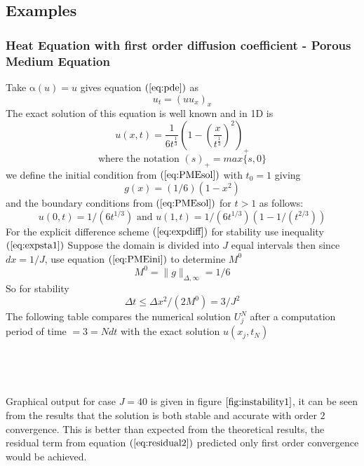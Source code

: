 \documentclass[11pt]{article}
\newcommand{\D}{\Delta}
\newcommand{\al}{\mathrm{\alpha}}
\begin{document}
\subsection{Examples}
\setcounter{tocdepth}{5}
\subsubsection{Heat Equation with first order diffusion coefficient - Porous Medium Equation }
Take $\al(u) = u $ gives equation $(\ref{eq:pde})$ as
\begin{equation} 
u_t = (uu_x)_x
\end{equation}
The exact solution of this equation is well known \cite{Baines2016} and in 1D is
\begin{equation}
\label{eq:PMEsol}
u(x,t) = \frac{1}{6t^{ \frac{1}{3} }  } \left(  1-\left(    \frac{x }{t^{\frac{1}{3}  }  } \right)^2   \right)_{+}
\end{equation}
$$\text{where the notation } (s)_{+ }= max\{s,0\} $$
we define the initial condition from $(\ref{eq:PMEsol})$ with $t_0 = 1$ giving
\begin{equation}
\label{eq:PMEini}
 g(x) = (1/6)(1-x^2)
\end{equation}
and the boundary conditions from $(\ref{eq:PMEsol})$ for $t > 1$ as follows:
$$ u(0,t) = 1/(6t^{1/3}) \text{ and } u(1,t) = 1/(6t^{1/3})\left(1-1/(t^{2/3})\right)$$
For the explicit difference scheme $(\ref{eq:expdiff})$ for stability use inequality $(\ref{eq:expsta1})$
Suppose the domain is divided into $J$ equal intervals then since $dx = 1/J $, use equation $(\ref{eq:PMEini})$ to determine $M^0$
$$M^0 = \|g\|_{\D,\infty} = 1/6$$
So for stability $$\D{t} \leq \D{x^2}/(2M^0) = 3/J^2$$
The following table compares the numerical solution $U_j^N$ after a computation period of time $= 3 = Ndt$ with the exact solution $u(x_j,t_N)$ \\
\\
\\
\\
\\Graphical output for case $J=40$ is given in figure $\ref{fig:instability1}$, it can be seen from the results that the solution is both stable and accurate with order $2$ convergence. This is better than expected from the theoretical results, the residual term from equation $(\ref{eq:residual2})$ predicted only first order convergence would be achieved.
\end{document}
